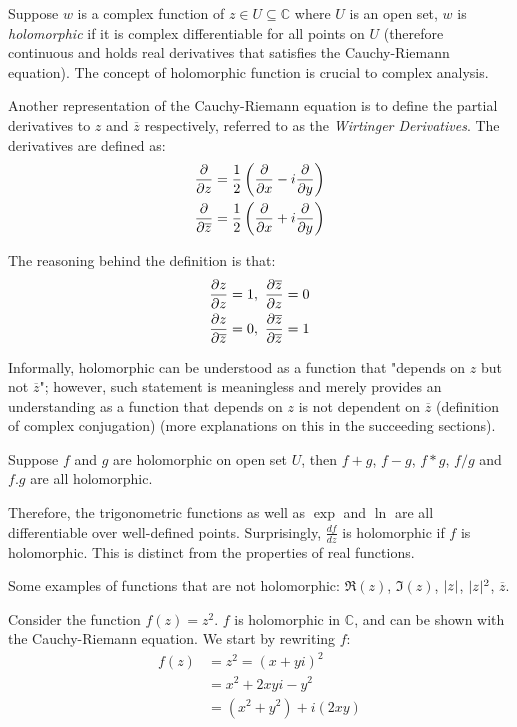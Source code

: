 \documentclass[12pt]{article}
\begin{document}
	Suppose $w$ is a complex function of $z \in U \subseteq \mathbb{C}$ where $U$ is an open set, $w$ is \textit{holomorphic} if it is complex differentiable for all points on $U$ (therefore continuous and holds real derivatives that satisfies the Cauchy-Riemann equation). The concept of holomorphic function is crucial to complex analysis.
	
	Another representation of the Cauchy-Riemann equation is to define the partial derivatives to $z$ and $\overline{z}$ respectively, referred to as the \textit{Wirtinger Derivatives}. The derivatives are defined as:
	\begin{align*}
		\frac{\partial}{\partial z} &= \frac{1}{2}\left(\frac{\partial}{\partial x} - i\frac{\partial}{\partial y}\right) \\
		\frac{\partial}{\partial \overline{z}} &= \frac{1}{2}\left(\frac{\partial}{\partial x} + i\frac{\partial}{\partial y}\right)
	\end{align*}
	
	The reasoning behind the definition is that:
	\begin{align*}
		\frac{\partial z}{\partial z} = 1&,\ \frac{\partial \overline{z}}{\partial z} = 0 \\
		\frac{\partial z}{\partial \overline{z}} = 0&,\ \frac{\partial \overline{z}}{\partial \overline{z}} = 1
	\end{align*}
	
	Informally, holomorphic can be understood as a function that "depends on $z$ but not $\overline{z}$";  however, such statement is meaningless and merely provides an understanding as a function that depends on $z$ is not dependent on $\overline{z}$ (definition of complex conjugation) (more explanations on this in the succeeding sections).
	
	Suppose $f$ and $g$ are holomorphic on open set $U$, then $f + g$, $f - g$, $f * g$, $f / g$ and $f.g$ are all holomorphic.
	
	Therefore, the trigonometric functions as well as $\exp$ and $\ln$ are all differentiable over well-defined points. Surprisingly, $\frac{df}{dz}$ is holomorphic if $f$ is holomorphic. This is distinct from the properties of real functions.
	
	Some examples of functions that are not holomorphic: $\Re(z)$, $\Im(z)$, $\lvert z \rvert$, $\lvert z \rvert^2$, $\overline{z}$.
	
	Consider the function $f(z) = z^2$. $f$ is holomorphic in $\mathbb{C}$, and can be shown with the Cauchy-Riemann equation. We start by rewriting $f$:
	\begin{align*}
		f(z) &= z^2 = (x + yi)^2 \\
		&= x^2 + 2xyi - y^2 \\
		&= (x^2 + y^2) + i(2xy)
	\end{align*}
	
\end{document}
